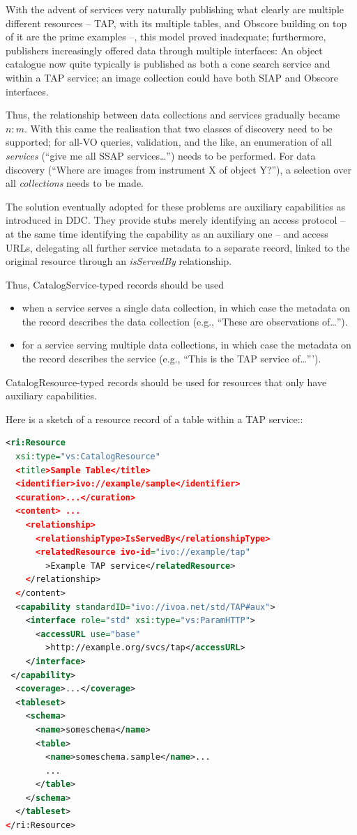 \documentclass[11pt,a4paper]{ivoa}
\begin{document}
With the advent of services very naturally publishing what clearly
are multiple different resources -- TAP, with its multiple tables, and
Obscore building on top of it are the prime examples --, this model
proved inadequate; furthermore, publishers increasingly offered data
through multiple interfaces: An object catalogue now quite typically is
published as both a cone search service and within a TAP service; an
image collection could have both SIAP and Obscore interfaces.

Thus, the relationship between data collections and services gradually
became $n:m$.  With this came the realisation that two classes of
discovery need to be supported; for all-VO queries, validation, and the
like, an enumeration of all \emph{services} (``give me all SSAP
services\dots'') needs to be performed.  For data discovery (``Where are
images from instrument X of object Y?''), a selection over all
\emph{collections} needs to be made.

The solution eventually adopted for these problems are auxiliary
capabilities as introduced in DDC.  They provide stubs merely
identifying an access protocol -- at the same time identifying the
capability as an auxiliary one --  and access URLs, delegating all
further service metadata to a separate record, linked to the original
resource through an \emph{isServedBy} relationship.

Thus, CatalogService-typed records should be used

\begin{itemize}
\item when a service serves a single data collection, in which case the
metadata on the record describes the data collection (e.g., ``These are
observations of\dots'').
\item for a service serving multiple data collections, in which case the
metadata on the record  describes the service (e.g., ``This is the TAP
service of\dots''').
\end{itemize}

CatalogResource-typed records should be used for resources that only
have auxiliary capabilities.

Here is a sketch of a resource record of a table within a TAP service::

\begin{lstlisting}[language=XML,basicstyle=\footnotesize]
<ri:Resource 
  xsi:type="vs:CatalogResource"
  <title>Sample Table</title>
  <identifier>ivo://example/sample</identifier>
  <curation>...</curation>
  <content> ...
    <relationship>
      <relationshipType>IsServedBy</relationshipType>
      <relatedResource ivo-id="ivo://example/tap"
        >Example TAP service</relatedResource>
    </relationship>
  </content>
  <capability standardID="ivo://ivoa.net/std/TAP#aux">
    <interface role="std" xsi:type="vs:ParamHTTP">
      <accessURL use="base"
        >http://example.org/svcs/tap</accessURL>
    </interface>
 </capability>
  <coverage>...</coverage>
  <tableset>
    <schema>
      <name>someschema</name>
      <table>
        <name>someschema.sample</name>...
        ...
      </table>
    </schema>
  </tableset>
</ri:Resource>
\end{lstlisting}
\end{document}

